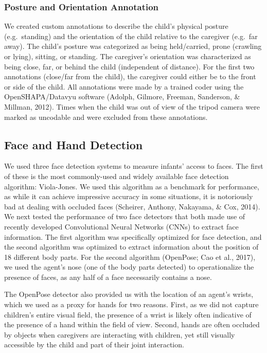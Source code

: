 \documentclass[english,man]{apa6}
\begin{document}
\subsubsection{Posture and Orientation
Annotation}\label{posture-and-orientation-annotation}

We created custom annotations to describe the child's physical posture
(e.g.~standing) and the orientation of the child relative to the
caregiver (e.g.~far away). The child's posture was categorized as being
held/carried, prone (crawling or lying), sitting, or standing. The
caregiver's orientation was characterized as being close, far, or behind
the child (independent of distance). For the first two annotations
(close/far from the child), the caregiver could either be to the front
or side of the child. All annotations were made by a trained coder using
the OpenSHAPA/Datavyu software (Adolph, Gilmore, Freeman, Sanderson, \&
Millman, 2012). Times when the child was out of view of the tripod
camera were marked as uncodable and were excluded from these
annotations.

\subsection{Face and Hand Detection}\label{face-and-hand-detection}

We used three face detection systems to measure infants' access to
faces. The first of these is the most commonly-used and widely available
face detection algorithm: Viola-Jones. We used this algorithm as a
benchmark for performance, as while it can achieve impressive accuracy
in some situations, it is notoriously bad at dealing with occluded faces
(Scheirer, Anthony, Nakayama, \& Cox, 2014). We next tested the
performance of two face detectors that both made use of recently
developed Convolutional Neural Networks (CNNs) to extract face
information. The first algorithm was specifically optimized for face
detection, and the second algorithm was optimized to extract information
about the position of 18 different body parts. For the second algorithm
(OpenPose; Cao et al., 2017), we used the agent's nose (one of the body
parts detected) to operationalize the presence of faces, as any half of
a face necessarily contains a nose.

The OpenPose detector also provided us with the location of an agent's
wrists, which we used as a proxy for hands for two reasons. First, as we
did not capture children's entire visual field, the presence of a wrist
is likely often indicative of the presence of a hand within the field of
view. Second, hands are often occluded by objects when caregivers are
interacting with children, yet still visually accessible by the child
and part of their joint interaction.
\end{document}
